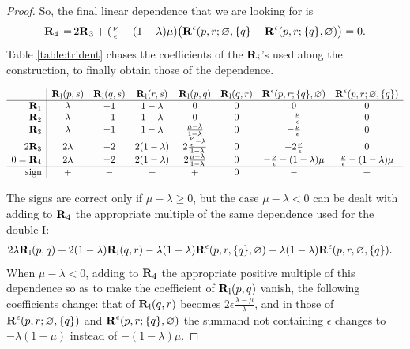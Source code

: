 \documentclass{amsart}
\theoremstyle{definition}
\renewcommand{\b}[1]{{\boldsymbol{#1}}} %
\newcommand{\eqdef}{\mbox{\,\raisebox{0.2ex}{\scriptsize\ensuremath{\mathrm:}}\ensuremath{=}\,}} %
\newcommand{\Rvector}{\b{\rm R}} %
\newcommand{\lon}{\operatorname{l}} %
\newcommand{\Rlong}{\Rvector_{\lon}} %
\newcommand{\Reps}{\Rvector^\epsilon} %
\begin{document}
\begin{proof}
So, the final linear dependence that we are looking for is 
\[
\Rvector_4 \eqdef 2 \Rvector_3  + ( \tfrac{\nu}{\epsilon}-  (1-\lambda) \mu ) \big(\Reps(p,r; \varnothing,\{q\} + \Reps(p,r; \{q\}, \varnothing)\big) =0.
\]
Table \ref{table:trident} chases the coefficients of the $\Rvector_i$'s used along the construction, to finally obtain those of the dependence.

\begin{table}[htb]
\begin{center}
$
\begin{array}{r|ccccccc}
&\Rlong(p,s)&\Rlong(q,s)&\Rlong(r,s)&\Rlong(p,q)&\Rlong(q,r)&\Reps(p,r; \{q\}, \varnothing)& \Reps(p,r; \varnothing, \{q\})\\
\hline
\Rvector_1 & \lambda & -1 & 1-\lambda & 0 & 0 & 0 & 0 \\
\Rvector_2 &\lambda & -1 & 1-\lambda & 0 & 0 & -\tfrac{\nu}{\epsilon} & 0 \\
\Rvector_3 &\lambda & -1 & 1-\lambda &  \tfrac{\mu-\lambda}{1-\lambda} & 0 & -\tfrac{\nu}{\epsilon} & 0 \\
2 \Rvector_3 &2\lambda & -2 & 2(1-\lambda) &  2\tfrac{\tfrac{\nu}{\epsilon}-\lambda}{1-\lambda} & 0 & -2\tfrac{\nu}{\epsilon} & 0 \\
0 =  \Rvector_4 &2\lambda & -2 & 2(1-\lambda) &  2\tfrac{\mu-\lambda}{1-\lambda} & 0 & -  \tfrac{\nu}{\epsilon}-  (1-\lambda) \mu  &  \tfrac{\nu}{\epsilon}-  (1-\lambda) \mu  \\
 \hline
 \text{sign} & + & - & + & + & 0 & - & + \\
\end{array}
$
\end{center}
\caption{The linear dependence $\Rvector_4$ of \cref{prop:fundamentalDependence} for a trident, assuming $\mu > \lambda$.
The signs of the coefficients are as shown whenever $\epsilon>0$ satisfies $|(1-\lambda) \mu\epsilon| <\nu$.
}
\label{table:trident}
\end{table}

The signs are correct only if $\mu-\lambda\ge 0$, but the case $\mu-\lambda < 0$ can be dealt with adding to $\Rvector_4$ the appropriate multiple of the same dependence used for the double-I:
\begin{align*}
& 2 \lambda\Rlong(p, q) + 2(1-\lambda)\Rlong(q, r) 
-   \lambda(1-\lambda)\Reps(p, r, \{q\}, \varnothing) - \lambda(1-\lambda)\Reps(p, r, \varnothing, \{q\}) .
\end{align*}
When $\mu-\lambda < 0$, adding to $ \Rvector_4$ the appropriate positive multiple of this dependence so as to make the coefficient of $\Rlong(p,q)$ vanish,  the following coefficients change:  
that of  $\Rlong(q,r)$ becomes $2\epsilon\tfrac{\lambda-\mu}{\lambda}$, and in those of $\Reps(p,r; \varnothing, \{q\})$ and  $\Reps(p,r; \{q\}, \varnothing)$ the summand not containing $\epsilon$  changes to  $-\lambda(1-\mu)$ instead of $-(1-\lambda)\mu$.


\end{proof}
\end{document}

